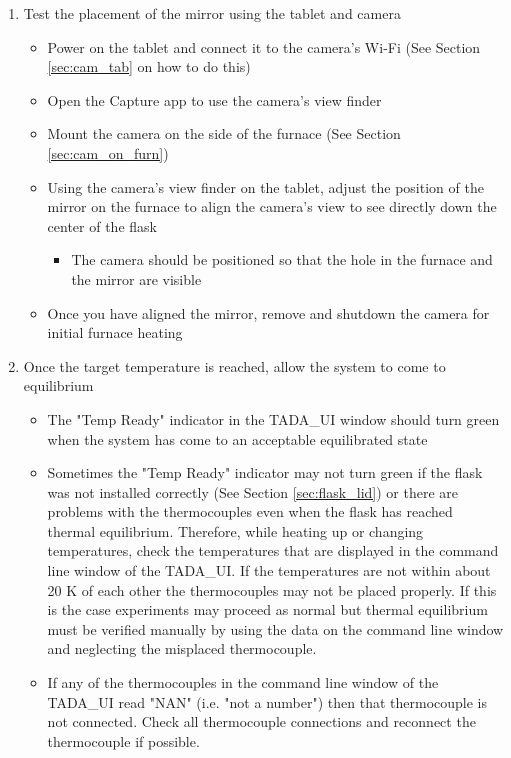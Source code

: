 \documentclass[letterpaper,11pt]{article}
\begin{document}
\begin{enumerate}
    \item Test the placement of the mirror using the tablet and camera %
        \begin{itemize}
        \item Power on the tablet and connect it to the camera's Wi-Fi (See 
            Section \ref{sec:cam_tab} on how to do this)
        \item Open the Capture app to use the camera's view finder
        \item Mount the camera on the side of the furnace (See Section 
            \ref{sec:cam_on_furn})
           
        \item Using the camera's view finder on the tablet, adjust the
            position of the mirror on the furnace to align the camera's view to 
            see directly down the center of the flask
            \begin{itemize}
            \item The camera should be positioned so that the hole in the 
                furnace and the mirror are visible 
            \end{itemize}
        \item Once you have aligned the mirror, remove and shutdown the camera 
            for initial furnace heating
        \end{itemize}

    \item Once the target temperature is reached, allow the system to come to 
        equilibrium
        \begin{itemize}
        \item The "Temp Ready" indicator in the TADA\_UI window should turn 
            green when the system has come to an acceptable equilibrated state
        \item Sometimes the "Temp Ready" indicator may not turn green
            if the flask was not installed correctly (See Section
            \ref{sec:flask_lid}) or there are problems with the thermocouples 
            even when the flask has reached thermal equilibrium. Therefore,
            while heating up or changing temperatures, check the temperatures
            that are displayed in the command line window of the TADA\_UI. If 
            the temperatures are not within about 20 K of each other the 
            thermocouples may not be placed properly. If this is the case 
            experiments may proceed as normal but thermal equilibrium must be 
            verified manually by using the data on the command line window 
            and neglecting the misplaced thermocouple.
        \item If any of the thermocouples in the command line window of the 
            TADA\_UI read "NAN" (i.e. "not a number") then that thermocouple is 
            not connected. Check all thermocouple connections and reconnect the 
            thermocouple if possible.
        \end{itemize}
    \end{enumerate}
\end{document}

